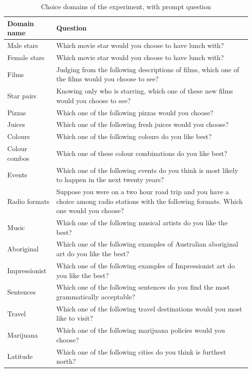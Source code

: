 \documentclass[11pt,letter]{article}
\begin{document}
\begin{table}[h!]
  \centering
  \caption{Choice domains of the experiment, with prompt question}
  \label{t:domains}
  \begin{small}
    \begin{tabular}{lp{12cm}}
      Domain name & Question\\
      \hline
      Male stars & Which movie star would you choose to have lunch with? \\
		  Female stars & Which movie star would you choose to have lunch with? \\
		  Films & Judging from the following descriptions of films, which one of the films would you choose to see? \\
		  Star pairs & Knowing only who is starring, which one of these new films would you choose to see? \\
		  Pizzas & Which one of the following pizzas would you choose? \\
		  Juices & Which one of the following fresh juices would you choose? \\
		  Colours & Which one of the following colours do you like best? \\
		  Colour combos & Which one of these colour combinations do you like best? \\
		  Events & Which one of the following events do you think is most likely to happen in the next twenty years? \\
		  Radio formats & Suppose you were on a two hour road trip and you have a choice among radio stations with the following formats.
Which one would you choose? \\
		  Music & Which one of the following musical artists do you like the best? \\
		  Aboriginal & Which one of the following examples of Australian aboriginal art do you like the best? \\
		  Impressionist & Which one of the following examples of Impressionist art do you like the best? \\
		  Sentences & Which one of the following sentences do you find the most grammatically acceptable? \\
		  Travel & Which one of the following travel destinations would you most like to visit? \\
		  Marijuana & Which one of the following marijuana policies would you choose? \\
		  Latitude & Which one of the following cities do you think is furthest north? \\

\end{tabular}
\end{small}
\end{table}
\end{document}
